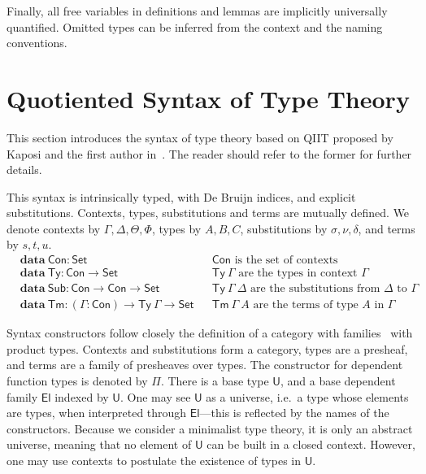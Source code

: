 \documentclass[a4paper,UKenglish,cleveref]{lipics-v2019}
\newcommand{\agdaSymb}[1]{\mathsf{#1}}
\newcommand{\agdaKW}[1]{\mathbf{#1}}
\newcommand{\data}{\agdaKW{data}}
\newcommand{\Set}{\agdaSymb{Set}}
\newcommand{\Ty}{\agdaSymb{Ty}}
\newcommand{\Con}{\agdaSymb{Con}}
\newcommand{\Tms}{\agdaSymb{Sub}}
\newcommand{\Tm}{\agdaSymb{Tm}}
\newcommand{\U}{\agdaSymb{U}}
\newcommand{\El}{\agdaSymb{El}}
\begin{document}
Finally, all free variables in definitions and lemmas are implicitly
universally quantified. Omitted types can be inferred from the context and the
naming conventions.

\section{Quotiented Syntax of Type Theory}
\label{sec:syntax}
This section introduces the syntax of type theory based on QIIT proposed by
Kaposi and the first author in~\cite{kaposi2016type,kaposi2016normalisation}.
The reader should refer to the former for further details.

This syntax is intrinsically typed, with De Bruijn indices, and explicit
substitutions. Contexts, types, substitutions and terms are mutually defined.
We denote contexts by $\Gamma,\Delta,\Theta,\Phi$, types by $A,B,C$,
substitutions by $\sigma,\nu,\delta$, and terms by $s,t,u$.
\begin{align*}
  & \data\ \Con : \Set
  && \text{$\Con$ is the set of contexts} \\
  & \data\ \Ty : \Con \to \Set
  && \text{$\Ty\ \Gamma$ are the types in context $\Gamma$} \\
  & \data\ \Tms : \Con \to \Con \to \Set
  && \text{$\Ty\ \Gamma\ \Delta$ are the substitutions from $\Delta$ to $\Gamma$}\\
  & \data\ \Tm : (\Gamma : \Con) \to \Ty\ \Gamma \to \Set
  && \text{$\Tm\ \Gamma\ A$ are the terms of type $A$ in $\Gamma$}
\end{align*}

Syntax constructors follow closely the definition of a category with
families~\cite{dybjer1995cwf,hofmann1997syntax} with product types. Contexts
and substitutions form a category, types are a presheaf, and terms are a family
of presheaves over types. The constructor for dependent function types is
denoted by $\Pi$. There is a base type $\U$, and a base dependent family $\El$
indexed by $\U$. One may see $\U$ as a universe, i.e.\ a type whose elements
are types, when interpreted through $\El$---this is reflected by the names of
the constructors. Because we consider a minimalist type theory, it is only an
abstract universe, meaning that no element of $\U$ can be built in a
closed context. However, one may use contexts to postulate the existence of
types in $\U$.
\end{document}
